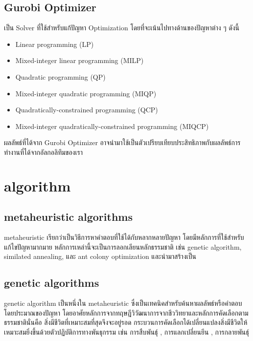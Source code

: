 \subsection{Gurobi Optimizer}
เป็น Solver ที่ใช้สำหรับแก้ปัญหา Optimization โดยที่จะเน้นไปทางด้านของปัญหาต่าง ๆ ดังนี้ 
\begin{itemize}
  \item Linear programming (LP)
  \item Mixed-integer linear programming (MILP)
  \item Quadratic programming (QP)
  \item Mixed-integer quadratic programming (MIQP)
  \item Quadratically-constrained programming (QCP)
  \item Mixed-integer quadratically-constrained programming (MIQCP)
\end{itemize}
ผลลัพธ์ที่ได้จาก Gurobi Optimizer อาจนำมาใช้เป็นตัวเปรียบเทียบประสิทธิภาพกับผลลัพธ์การทำงานที่ได้จากอัลกอลิทึมของเรา

\section{algorithm}
\subsection{metaheuristic algorithms}
meta­heuristic เรียกว่าเป็นวิธีการหาคำตอบที่ใช้ได้กับหลากหลายปัญหา โดยมีหลักการที่ใช้สำหรับแก้ไขปัญหามากมาย
หลักการเหล่านี้จะเป็นการลอกเลียนหลักธรรมชาติ เช่น genetic algorithm, similated annealing, และ ant colony
optimization และนำมาสร้างเป็น

\subsection{genetic algorithms}
genetic algorithm  เป็นหนึ่งใน metaheuristic ซึ่งเป็นเทคนิคสำหรับค้นหาผลลัพธ์หรือคำตอบโดยประมาณของปัญหา โดยอาศัยหลักการจากทฤษฎีวิวัฒนาการจากชีววิทยาและหลักการคัดเลือกตามธรรมชาตินั่นคือ 
สิ่งมีชีวิตที่เหมาะสมที่สุดจึงจะอยู่รอด กระบวนการคัดเลือกได้เปลี่ยนแปลงสิ่งมีชีวิตให้เหมาะสมยิ่งขึ้นด้วยตัวปฏิบัติการทางพันธุกรรม เช่น การสืบพันธุ์ , การแลกเปลี่ยนยีน , การกลายพันธุ์  


